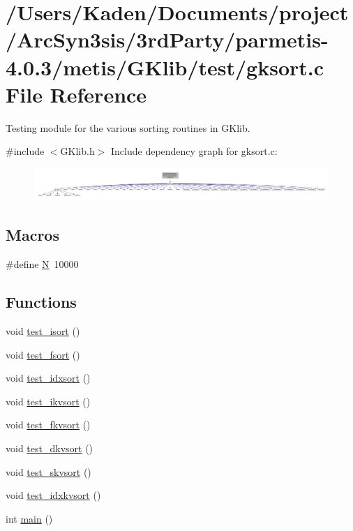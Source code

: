 \hypertarget{a00152}{}\section{/\+Users/\+Kaden/\+Documents/project/\+Arc\+Syn3sis/3rd\+Party/parmetis-\/4.0.3/metis/\+G\+Klib/test/gksort.c File Reference}
\label{a00152}


Testing module for the various sorting routines in G\+Klib.  


{\ttfamily \#include $<$G\+Klib.\+h$>$}\newline
Include dependency graph for gksort.\+c\+:\nopagebreak
\begin{figure}[H]
\begin{center}
\leavevmode
\includegraphics[width=350pt]{a00153}
\end{center}
\end{figure}
\subsection*{Macros}
\begin{DoxyCompactItemize}
\item 
\#define \hyperlink{a00152_a73a9c02e249ae933af5b00aa8fd375a9}{N}~10000
\end{DoxyCompactItemize}
\subsection*{Functions}
\begin{DoxyCompactItemize}
\item 
void \hyperlink{a00152_a8de21ffeb988c6322635a778ecdd4066}{test\+\_\+isort} ()
\item 
void \hyperlink{a00152_a92bfe9a7c6bec5eab568c71eda7eb1f1}{test\+\_\+fsort} ()
\item 
void \hyperlink{a00152_a3a4da1d3370fc7c176261dfc8eef5691}{test\+\_\+idxsort} ()
\item 
void \hyperlink{a00152_a03d0ef2537e50ad38d65892cc9c28118}{test\+\_\+ikvsort} ()
\item 
void \hyperlink{a00152_a179814629e9b2ff14387734d6ac52a38}{test\+\_\+fkvsort} ()
\item 
void \hyperlink{a00152_a91e0ce6fc88d5ab6695cda68dc4e79b5}{test\+\_\+dkvsort} ()
\item 
void \hyperlink{a00152_ae2471bde9a7e9419d330392c2e2b35fd}{test\+\_\+skvsort} ()
\item 
void \hyperlink{a00152_ab63d10c508d01adca7672ac341b950ba}{test\+\_\+idxkvsort} ()
\item 
int \hyperlink{a00152_ae66f6b31b5ad750f1fe042a706a4e3d4}{main} ()
\end{DoxyCompactItemize}


